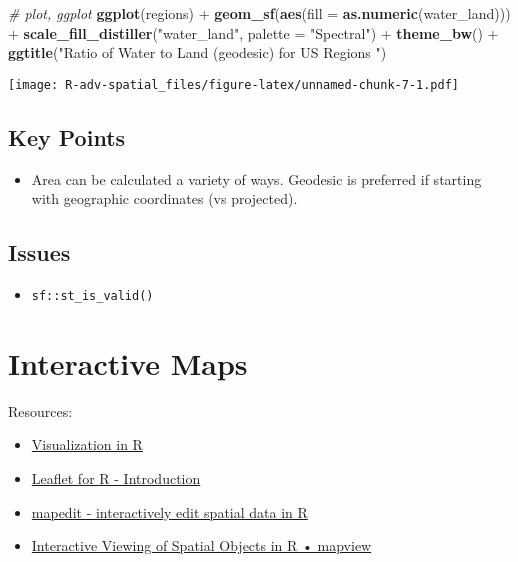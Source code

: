\documentclass[]{book}
\newenvironment{Shaded}{\begin{snugshade}}{\end{snugshade}}
\newcommand{\KeywordTok}[1]{\textcolor[rgb]{0.13,0.29,0.53}{\textbf{{#1}}}}
\newcommand{\DataTypeTok}[1]{\textcolor[rgb]{0.13,0.29,0.53}{{#1}}}
\newcommand{\StringTok}[1]{\textcolor[rgb]{0.31,0.60,0.02}{{#1}}}
\newcommand{\CommentTok}[1]{\textcolor[rgb]{0.56,0.35,0.01}{\textit{{#1}}}}
\newcommand{\NormalTok}[1]{{#1}}
\providecommand{\tightlist}{%
  \setlength{\itemsep}{0pt}\setlength{\parskip}{0pt}}
\begin{document}
\begin{Shaded}
\begin{Highlighting}[]
\CommentTok{# plot, ggplot}
\KeywordTok{ggplot}\NormalTok{(regions) +}
\StringTok{  }\KeywordTok{geom_sf}\NormalTok{(}\KeywordTok{aes}\NormalTok{(}\DataTypeTok{fill =} \KeywordTok{as.numeric}\NormalTok{(water_land))) +}
\StringTok{  }\KeywordTok{scale_fill_distiller}\NormalTok{(}\StringTok{"water_land"}\NormalTok{, }\DataTypeTok{palette =} \StringTok{"Spectral"}\NormalTok{) +}
\StringTok{  }\KeywordTok{theme_bw}\NormalTok{() +}
\StringTok{  }\KeywordTok{ggtitle}\NormalTok{(}\StringTok{"Ratio of Water to Land (geodesic) for US Regions "}\NormalTok{)}
\end{Highlighting}
\end{Shaded}

\texttt{[image: R-adv-spatial\_files/figure-latex/unnamed-chunk-7-1.pdf]}

\section{Key Points}\label{key-points}

\begin{itemize}
\tightlist
\item
  Area can be calculated a variety of ways. Geodesic is preferred if
  starting with geographic coordinates (vs projected).
\end{itemize}

\section{Issues}\label{issues}

\begin{itemize}
\tightlist
\item
  \texttt{sf::st\_is\_valid()}
\end{itemize}

\chapter{Interactive Maps}\label{interactive}

Resources:

\begin{itemize}
\tightlist
\item
  \href{http://remi-daigle.github.io/2016-04-15-UCSB/viz/}{Visualization
  in R}
\item
  \href{http://rstudio.github.io/leaflet/}{Leaflet for R - Introduction}
\item
  \href{http://r-spatial.org/r/2017/01/30/mapedit_intro.html}{mapedit -
  interactively edit spatial data in R}
\item
  \href{https://r-spatial.github.io/mapview/}{Interactive Viewing of
  Spatial Objects in R • mapview}
\end{itemize}
\end{document}

